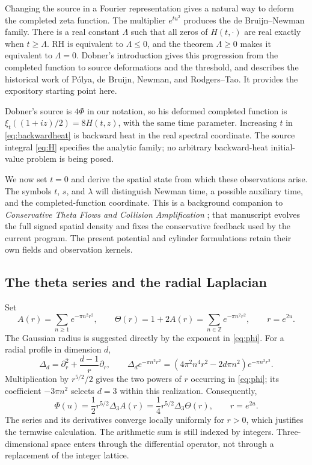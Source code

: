 \documentclass[11pt]{article}
\theoremstyle{remark}
\numberwithin{equation}{section}
\begin{document}
Changing the source in a Fourier representation gives a natural way to
deform the completed zeta function. The multiplier \(e^{tu^2}\)
produces the de Bruijn--Newman family. There is a real constant
\(\Lambda\) such that all zeros of \(H(t,\cdot)\) are real exactly
when \(t\ge\Lambda\). RH is equivalent to \(\Lambda\le0\), and
the theorem \(\Lambda\ge0\) makes it equivalent to \(\Lambda=0\).
Dobner's introduction \cite[Section~1]{Dobner} gives this progression
from the completed function to source deformations and the threshold,
and describes the historical work of P\'olya, de Bruijn, Newman, and
Rodgers--Tao. It provides the expository starting point here.

Dobner's source is \(4\Phi\) in our notation, so his deformed
completed function is \(\xi_t((1+iz)/2)=8H(t,z)\), with the same
time parameter. Increasing \(t\) in \eqref{eq:backwardheat} is
backward heat in the real spectral coordinate. The source integral
\eqref{eq:H} specifies the analytic family; no arbitrary backward-heat
initial-value problem is being posed.

We now set \(t=0\) and derive the spatial state from which these
observations arise. The symbols \(t\), \(s\), and \(\lambda\)
will distinguish Newman time, a possible auxiliary time, and the
completed-function coordinate. This is a background companion to
\emph{Conservative Theta Flows and Collision Amplification}
\cite{ConservativeFlow}; that manuscript evolves the full signed spatial
density and fixes the conservative feedback used by the current program.
The present potential and cylinder formulations retain their own fields
and observation kernels.

\subsection{The theta series and the radial Laplacian}

Set
\begin{equation}\label{eq:theta}
 A(r)=\sum_{n\ge1}e^{-\pi n^2r^2},\qquad
 \Theta(r)=1+2A(r)=\sum_{n\in\mathbb Z}e^{-\pi n^2r^2},
 \qquad r=e^{2u}.
\end{equation}
The Gaussian radius is suggested directly by the exponent in
\eqref{eq:phi}. For a radial profile in dimension \(d\),
\begin{equation}\label{eq:gaussian}
 \Delta_d=\partial_r^2+\frac{d-1}{r}\partial_r,\qquad
 \Delta_d e^{-\pi n^2r^2}
 =(4\pi^2n^4r^2-2d\pi n^2)e^{-\pi n^2r^2}.
\end{equation}
Multiplication by \(r^{5/2}/2\) gives the two powers of \(r\)
occurring in \eqref{eq:phi}; its coefficient \(-3\pi n^2\)
selects \(d=3\) within this realization. Consequently,
\begin{equation}\label{eq:source}
 \boxed{\displaystyle
 \Phi(u)=\frac12r^{5/2}\Delta_3 A(r)
        =\frac14r^{5/2}\Delta_3\Theta(r),\qquad r=e^{2u}.}
\end{equation}
The series and its derivatives converge locally uniformly for \(r>0\),
which justifies the termwise calculation. The arithmetic sum is still
indexed by integers. Three-dimensional space enters through the
differential operator, not through a replacement of the integer lattice.
\end{document}
